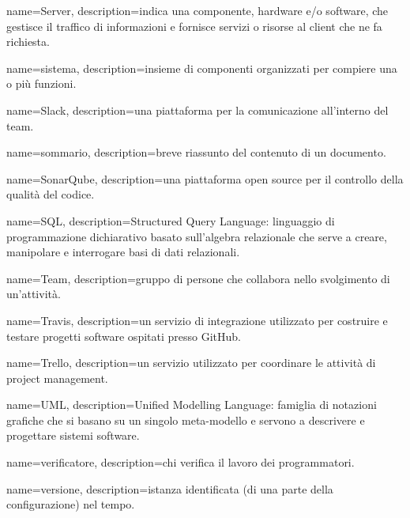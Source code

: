 {
name={Server},
description={indica una componente, hardware e/o software, che gestisce il traﬃco di informazioni e fornisce servizi o risorse al client che ne fa richiesta.}
}

{
name={sistema},
description={insieme di componenti organizzati per compiere una o più funzioni.}
}

{
name={Slack},
description={una piattaforma per la comunicazione all'interno del team.}
}

{
name={sommario},
description={breve riassunto del contenuto di un documento.}
}

{
name={SonarQube},
description={una piattaforma open source per il controllo della qualità del codice.}
}

{
name={SQL},
description={Structured Query Language: linguaggio di programmazione dichiarativo basato sull'algebra relazionale che serve a creare, manipolare e interrogare basi di dati relazionali.}
}

{
name={Team},
description={gruppo di persone che collabora nello svolgimento di un’attività.}
}

{
name={Travis},
description={un servizio di integrazione utilizzato per costruire e testare progetti software ospitati presso GitHub.}
}

{
name={Trello},
description={un servizio utilizzato per coordinare le attività di project management.}
}

{
name={UML},
description={Unified Modelling Language: famiglia di notazioni grafiche che si basano su un singolo meta-modello e servono a descrivere e progettare sistemi software.}
}

{
name={verificatore},
description={chi verifica il lavoro dei programmatori.}
}

{
name={versione},
description={istanza identificata (di una parte della configurazione) nel tempo.}
}
